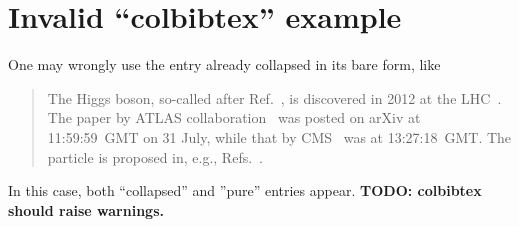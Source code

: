 \documentclass{article}
\newcommand\TODO[1]{{\color{red} \textbf{TODO: #1}}}
\begin{document}
\section*{Invalid ``colbibtex'' example}
One may wrongly use the entry already collapsed in its bare form, like
\begin{quote}
  The Higgs boson, so-called after Ref.~\cite{Higgs:1964pj}, is discovered in 2012 at the LHC~\cite{HiggsDiscovery}.
  The paper by ATLAS collaboration~\cite{Aad:2012tfa} was posted on arXiv at 11:59:59~GMT on 31 July, while that by CMS~\cite{Chatrchyan:2012xdj} was at 13:27:18~GMT.
  The particle is proposed in, e.g., Refs.~\cite{Higgs:1964pj,Englert:1964et}.
\end{quote}
In this case, both ``collapsed'' and ''pure'' entries appear.
\TODO{colbibtex should raise warnings.}

\end{document}
